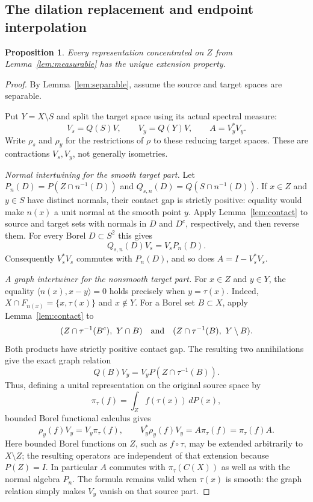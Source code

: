 \documentclass[11pt,letterpaper]{amsart}
\newtheorem{proposition}[theorem]{Proposition}
\theoremstyle{definition}
\theoremstyle{remark}
\numberwithin{equation}{section}
\begin{document}
\subsection{The dilation replacement and endpoint interpolation}

\begin{proposition}\label{prop:partner}
Every representation concentrated on $Z$ from Lemma~\ref{lem:measurable}
has the unique extension property.
\end{proposition}
\begin{proof}
By Lemma~\ref{lem:separable}, assume the source and target spaces
are separable.

Put $Y=X\setminus S$ and split the target space using its actual spectral
measure:
\[
 V_s=Q(S)V,\qquad V_y=Q(Y)V,\qquad A=V_y^*V_y.
\]
Write $\rho_s$ and $\rho_y$ for the restrictions of $\rho$ to these
reducing target spaces. These are contractions $V_s,V_y$, not generally
isometries.

\emph{Normal intertwining for the smooth target part.}
Let $P_n(D)=P(Z\cap n^{-1}(D))$ and
$Q_{s,n}(D)=Q(S\cap n^{-1}(D))$. If $x\in Z$ and $y\in S$
have distinct normals, their contact gap is strictly positive: equality
would make $n(x)$ a unit normal at the smooth point $y$.
Apply Lemma~\ref{lem:contact} to source and target sets with normals
in $D$ and $D^c$, respectively, and then reverse them. For every Borel
$D\subset S^2$ this gives
\[
                     Q_{s,n}(D)V_s=V_sP_n(D).
\]
Consequently $V_s^*V_s$ commutes with $P_n(D)$, and so does
$A=I-V_s^*V_s$.

\emph{A graph intertwiner for the nonsmooth target part.}
For $x\in Z$ and $y\in Y$, the equality
$\langle n(x),x-y\rangle=0$ holds precisely when $y=\tau(x)$.
Indeed, $X\cap F_{n(x)}=\{x,\tau(x)\}$ and $x\notin Y$.
For a Borel set $B\subset X$, apply Lemma~\ref{lem:contact} to
\[
 (Z\cap\tau^{-1}(B^c),\ Y\cap B)
 \quad\hbox{and}\quad
 (Z\cap\tau^{-1}(B),\ Y\setminus B).
\]
Both products have strictly positive contact gap. The resulting two
annihilations give the exact graph relation
\[
                   Q(B)V_y=V_yP(Z\cap\tau^{-1}(B)).
\]
Thus, defining a unital representation on the original source space by
\[
                \pi_\tau(f)=\int_Z f(\tau(x))\,dP(x),
\]
bounded Borel functional calculus gives
\[
                  \rho_y(f)V_y=V_y\pi_\tau(f),
 \qquad
 V_y^*\rho_y(f)V_y=A\pi_\tau(f)=\pi_\tau(f)A.
\]
Here bounded Borel functions on $Z$, such as $f\circ\tau$, may be
extended arbitrarily to $X\setminus Z$; the resulting operators are
independent of that extension because $P(Z)=I$.
In particular $A$ commutes with $\pi_\tau(C(X))$ as well as with the
normal algebra $P_n$. The formula remains valid when $\tau(x)$ is smooth:
the graph relation simply makes $V_y$ vanish on that source part.


\end{proof}
\end{document}

